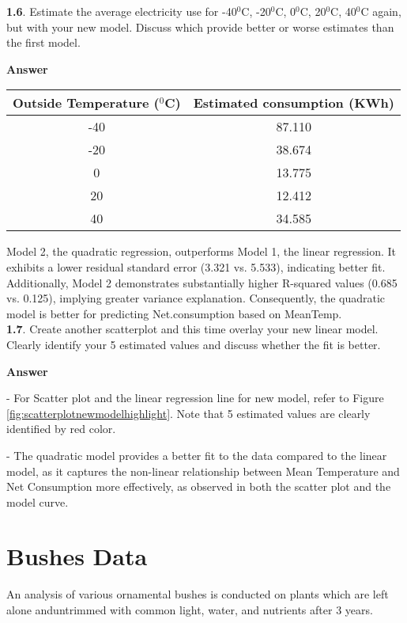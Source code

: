 \documentclass[12pt,doublespace]{article}
\begin{document}
	
	\textbf{1.6}. Estimate the average electricity use for -40$^{0}$C, -20$^{0}$C, 0$^{0}$C, 20$^{0}$C, 40$^{0}$C again, but with your new model. Discuss which provide better or worse estimates than the first model.
	
	\textbf{Answer}
	\begin{center}
		\begin{tabular}{|c|c|}
		\hline
		Outside Temperature ($^{0}$C) & Estimated consumption (KWh) \\
		\hline
		-40 & 87.110 \\
		\hline
		-20 & 38.674 \\
		\hline
		0 & 13.775 \\
		\hline
		20 & 12.412 \\
		\hline
		40 & 34.585 \\
		\hline
	\end{tabular}
	\end{center}
	
	Model 2, the quadratic regression, outperforms Model 1, the linear regression. It exhibits a lower residual standard error (3.321 vs. 5.533), indicating better fit. Additionally, Model 2 demonstrates substantially higher R-squared values (0.685 vs. 0.125), implying greater variance explanation. Consequently, the quadratic model is better for predicting Net.consumption based on MeanTemp.\\
	
	\textbf{1.7}. Create another scatterplot and this time overlay your new linear model. Clearly identify your 5 estimated values and discuss whether the fit is better.
	
	\textbf{Answer}
	
	- For Scatter plot and the linear regression line for new model, refer to Figure \ref{fig:scatterplotnewmodelhighlight}. Note that 5 estimated values are clearly identified by red color. 
	
	- The quadratic model provides a better fit to the data compared to the linear model, as it captures the non-linear relationship between Mean Temperature and Net Consumption more effectively, as observed in both the scatter plot and the model curve.
	
	\section {Bushes Data}
	An analysis of various ornamental bushes is conducted on plants which are left alone anduntrimmed with common light, water, and nutrients after 3 years.\\
	
\end{document}
